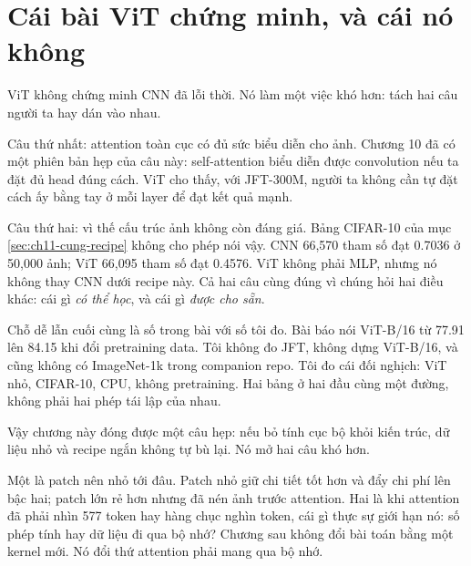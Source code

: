 \section{Cái bài ViT chứng minh, và cái nó không}
\label{sec:ch11-con-lai-gi}

%
ViT không chứng minh CNN đã lỗi thời. Nó làm một việc khó hơn: tách hai câu
người ta hay dán vào nhau.

Câu thứ nhất: attention toàn cục có đủ sức biểu diễn cho ảnh. Chương 10 đã có
một phiên bản hẹp của câu này: self-attention biểu diễn được convolution nếu
ta đặt đủ head đúng cách. ViT cho thấy, với JFT-300M, người ta không cần tự đặt
cách ấy bằng tay ở mỗi layer để đạt kết quả mạnh.

Câu thứ hai: vì thế cấu trúc ảnh không còn đáng giá. Bảng CIFAR-10 của mục
\ref{sec:ch11-cung-recipe} không cho phép nói vậy. CNN 66,570 tham số đạt
0.7036 ở 50,000 ảnh; ViT 66,095 tham số đạt 0.4576. ViT không phải MLP, nhưng
nó không thay CNN dưới recipe này. Cả hai câu cùng đúng vì chúng hỏi hai điều
khác: cái gì \emph{có thể học}, và cái gì \emph{được cho sẵn}.

Chỗ dễ lẫn cuối cùng là số trong bài với số tôi đo. Bài báo nói ViT-B/16 từ
77.91 lên 84.15 khi đổi pretraining data. Tôi không đo JFT, không dựng
ViT-B/16, và cũng không có ImageNet-1k trong companion repo. Tôi đo cái đối
nghịch: ViT nhỏ, CIFAR-10, CPU, không pretraining. Hai bảng ở hai đầu cùng một
đường, không phải hai phép tái lập của nhau.

Vậy chương này đóng được một câu hẹp: nếu bỏ tính cục bộ khỏi kiến trúc, dữ
liệu nhỏ và recipe ngắn không tự bù lại. Nó mở hai câu khó hơn.

Một là patch nên nhỏ tới đâu. Patch nhỏ giữ chi tiết tốt hơn và đẩy chi phí
lên bậc hai; patch lớn rẻ hơn nhưng đã nén ảnh trước attention. Hai là khi
attention đã phải nhìn 577 token hay hàng chục nghìn token, cái gì thực sự
giới hạn nó: số phép tính hay dữ liệu đi qua bộ nhớ? Chương sau không đổi bài
toán bằng một kernel mới. Nó đổi thứ attention phải mang qua bộ nhớ.
